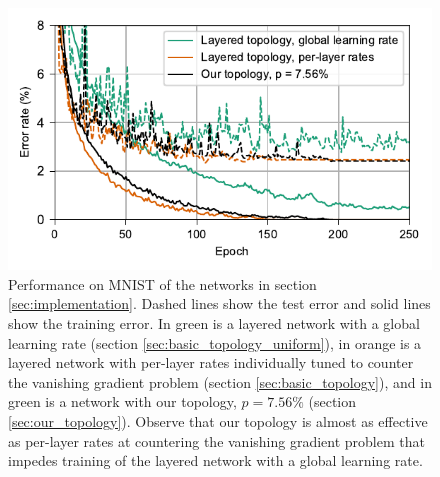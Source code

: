 \documentclass[utf8]{frontiersSCNS}
\begin{document}
\begin{figure}[h!]
\begin{center}
\includegraphics[width=\columnwidth]{figures/MNIST_network_comparison.pdf}
\end{center}
\caption{Performance on MNIST of the networks in section \ref{sec:implementation}. Dashed lines show the test error and solid lines show the training error. In green is a layered network with a global learning rate (section \ref{sec:basic_topology_uniform}), in orange is a layered network with per-layer rates individually tuned to counter the vanishing gradient problem (section \ref{sec:basic_topology}), and in green is a network with our topology, $p=7.56\%$ (section \ref{sec:our_topology}). Observe that our topology is almost as effective as per-layer rates at countering the vanishing gradient problem that impedes training of the layered network with a global learning rate.} \label{fig:mnist_comparison}
\end{figure}
\end{document}
